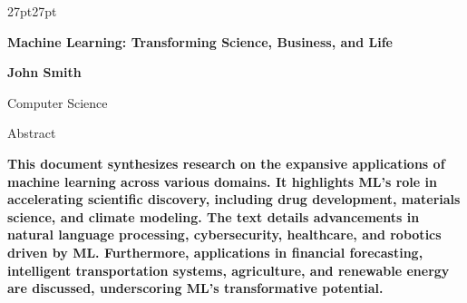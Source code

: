 \documentclass{article}
\begin{document}
\begin{adjustwidth}{27pt}{27pt}

\begin{center}
{\fontsize{20.0}{24}\sffamily\bfseries\selectfont\color{color_29791}%
Machine Learning: Transforming Science, Business, and Life\par}

\vspace{8pt}

{\fontsize{12}{14}\sffamily\selectfont\color{color_29791}%
\textbf{John Smith}\par}

\vspace{5pt}

{\fontsize{8.0}{10}\sffamily\selectfont\color{color_29791}%
Computer Science\par}

\vspace{10pt}

{\fontsize{8}{10}\sffamily\selectfont\color{color_29791}Abstract\par}
\end{center}

\vspace{3pt}
\noindent{}\par
\vspace{4pt}

{\fontsize{10}{11}\sffamily\bfseries\selectfont\color{color_29791}%
\justifying
\noindent
This document synthesizes research on the expansive applications of machine learning across various domains. It highlights ML's role in accelerating scientific discovery, including drug development, materials science, and climate modeling. The text details advancements in natural language processing, cybersecurity, healthcare, and robotics driven by ML. Furthermore, applications in financial forecasting, intelligent transportation systems, agriculture, and renewable energy are discussed, underscoring ML's transformative potential.\par}

\vspace{8pt}

\noindent{}

\end{adjustwidth}
\end{document}
